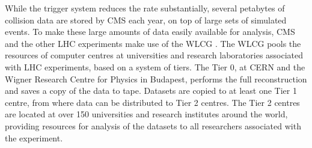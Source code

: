 While the trigger system reduces the rate substantially, several
petabytes of collision data are stored by \ac{CMS} each year, on top
of large sets of simulated events. 
To make these large amounts of data easily available for analysis, 
\ac{CMS} and the other \ac{LHC} experiments make use of the \ac{WLCG} \cite{lhc-wlcg}. 
The \ac{WLCG} pools the resources of computer centres at universities and research
laboratories associated with \ac{LHC} experiments, based on a system of tiers. The Tier 0, at \ac{CERN} and
the Wigner Research Centre for Physics in Budapest, performs the full reconstruction
and saves a copy of the data to tape. Datasets are copied to at least one Tier 1 centre, from
where data can be distributed to Tier 2 centres. The Tier 2 centres are located
at over 150 universities and research institutes around the world, providing 
resources for analysis of the datasets to all researchers associated with the experiment.



